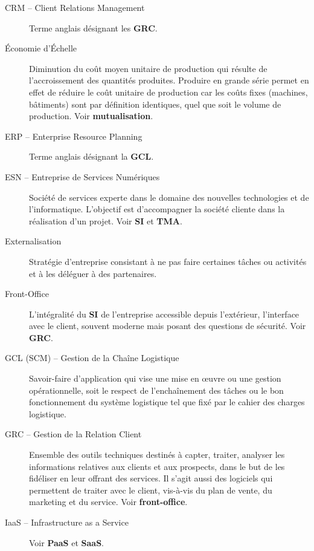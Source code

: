 \documentclass[10pt,a4paper,french]{article}
\begin{document}
\begin{description}
\item[CRM -- Client Relations Management]\label{glo:CRM}
Terme anglais désignant les \textbf{GRC}.

\item[Économie d'Échelle]\label{glo:econo-echelle} Diminution du coût moyen unitaire de production qui résulte de l’accroissement des quantités produites. Produire en grande série permet en effet de réduire le coût unitaire de production car les coûts fixes (machines, bâtiments) sont par définition identiques, quel que soit le volume de production. Voir \textbf{mutualisation}.

\item[ERP -- Enterprise Resource Planning]\label{glo:ERP}
Terme anglais désignant la \textbf{GCL}.

\item[ESN -- Entreprise de Services Numériques]\label{glo:ESN} Société de services experte dans le domaine des nouvelles technologies et de l'informatique. L'objectif est d'accompagner la société cliente dans la réalisation d'un projet. Voir \textbf{SI} et \textbf{TMA}.

\item[Externalisation]\label{glo:externalisation}
Stratégie d'entreprise consistant à ne pas faire certaines tâches ou activités et à les déléguer à des partenaires.

\item[Front-Office] \label{glo:front-office}  L'intégralité du \textbf{SI} de l'entreprise accessible depuis l'extérieur, l'interface avec le client, souvent moderne mais posant des questions de sécurité. Voir \textbf{GRC}.

\item[GCL (SCM) -- Gestion de la Chaîne Logistique]\label{glo:GCL}
\label{glo:SCM} Savoir-faire d'application qui vise une mise en œuvre ou une gestion opérationnelle, soit le respect de l'enchaînement des tâches ou le bon fonctionnement du système logistique tel que fixé par le cahier des charges logistique.

\item[GRC -- Gestion de la Relation Client] \label{glo:GRC}
Ensemble des outils techniques destinés à capter, traiter, analyser les informations relatives aux clients et aux prospects, dans le but de les fidéliser en leur offrant des services. Il s'agit aussi des logiciels qui permettent de traiter avec le client, vis-à-vis du plan de vente, du marketing et du service. Voir \textbf{front-office}.

\item[IaaS -- Infrastructure as a Service]\label{glo:iaas}
Voir \textbf{PaaS} et \textbf{SaaS}.


\end{description}
\end{document}
